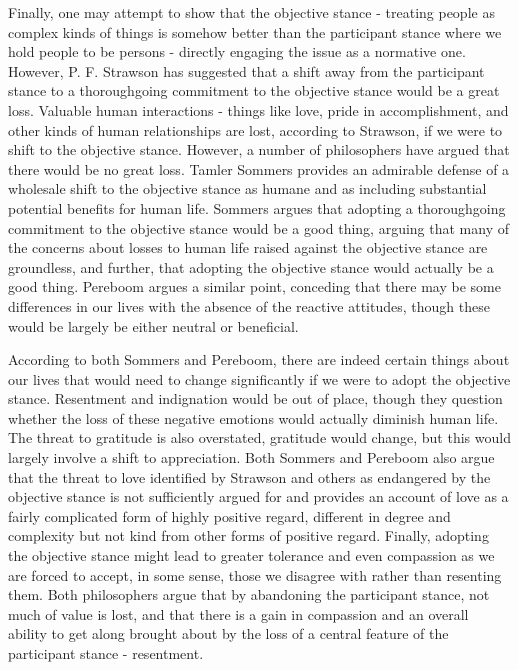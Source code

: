 \documentclass[phd,12pt,oneside,paper=letterpaper]{ubcthesis}
\begin{document}
Finally, one may attempt to show that the objective stance - treating people as complex kinds of things is somehow better than the participant stance where we hold people to be persons - directly engaging the issue as a normative one. However, P. F. Strawson has suggested that a shift away from the participant stance to a thoroughgoing commitment to the objective stance would be a great loss. Valuable human interactions - things like love, pride in accomplishment, and other kinds of human relationships are lost, according to Strawson, if we were to shift to the objective stance. However, a number of philosophers have argued that there would be no great loss.  Tamler Sommers \citeyearpar{sommers2007}provides an admirable defense of a wholesale shift to the objective stance as humane and as including substantial potential benefits for human life. Sommers argues that adopting a thoroughgoing commitment to the objective stance would be a good thing, arguing that many of the concerns about losses to human life raised against the objective stance are groundless, and further, that adopting the objective stance would actually be a good thing. Pereboom \citeyearpar{pereboom2001} argues a similar point, conceding that there may be some differences in our lives with the absence of the reactive attitudes, though these would be largely be either neutral or beneficial. 

According to both Sommers and Pereboom, there are indeed certain things about our lives that would need to change significantly if we were to adopt the objective stance. Resentment and indignation would be out of place, though they question whether the loss of these negative emotions would actually diminish human life. The threat to gratitude is also overstated, gratitude would change, but this would largely involve a shift to appreciation.  Both Sommers and Pereboom also argue that the threat to love identified by Strawson and others as endangered by the objective stance is not sufficiently argued for and provides an account of love as a fairly complicated form of highly positive regard, different in degree and complexity but not kind from other forms of positive regard. Finally, adopting the objective stance might lead to greater tolerance and even compassion as we are forced to accept, in some sense, those we disagree with rather than resenting them. Both philosophers argue that by abandoning the participant stance, not much of value is lost, and that there is a gain in compassion and an overall ability to get along brought about by the loss of a central feature of the participant stance - resentment. 
\end{document}
